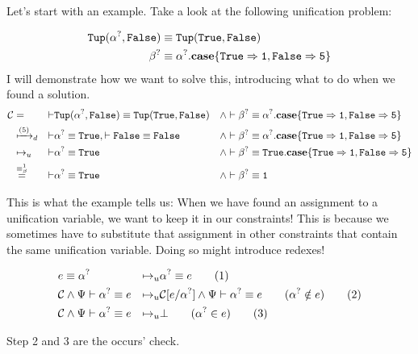 \documentclass[twoside,12pt,a4paper]{article}
\begin{document}
Let's start with an example. Take a look at the following unification problem:
\begin{example}
    \begin{align*}
        \mathtt{Tup(\alpha^?, False)}&\equiv \mathtt{Tup(True, False)}\\
        \beta^?&\equiv \alpha^?.\textbf{case}\{\mathtt{True \Rightarrow 1, False\Rightarrow 5}\}
    \end{align*}        
    I will demonstrate how we want to solve this, introducing what to do when we found a solution.
    \begin{align*}
        \mathcal{C} &= &\vdash& \mathtt{Tup(\alpha^?, False)}\equiv \mathtt{Tup(True, False)}&\wedge&
        \vdash \beta^?\equiv \alpha^?.\textbf{case}\{\mathtt{True \Rightarrow 1, False\Rightarrow 5}\}\\
        &\xmapsto{(5)}_d &\vdash& \mathtt{\alpha^?\equiv True}, \vdash \mathtt{False\equiv False} &\wedge& 
        \vdash \beta^?\equiv \alpha^?.\textbf{case}\{\mathtt{True \Rightarrow 1, False\Rightarrow 5}\}\\
        &\mapsto_u &\vdash&\mathtt{\alpha^?\equiv True} &\wedge&
        \vdash \beta^?\equiv \mathtt{True}.\textbf{case}\{\mathtt{True \Rightarrow 1, False\Rightarrow 5}\}\\
        &\stackrel{\equiv_{\beta}^1}{=} &\vdash&\mathtt{\alpha^?\equiv True} &\wedge&
        \vdash \beta^?\equiv \mathtt{1}
    \end{align*}      
\end{example}
This is what the example tells us: When we have found an assignment to a unification variable, we want to keep it in our constraints!
This is because we sometimes have to substitute that assignment in other constraints that contain the same unification variable.
Doing so might introduce redexes!
\begin{definition}[Unification]
    \begin{align*}
        & e \equiv\alpha^?
        &\mapsto_u& \alpha^? \equiv e 
        \tag{1}\\
        &\mathcal{C} \wedge \Psi \vdash \alpha^? \equiv e 
        &\mapsto_u& \mathcal{C}[e/\alpha^?] \wedge \Psi \vdash \alpha^? \equiv e \qquad (\alpha^? \notin e)
        \tag{2}\\
        &\mathcal{C} \wedge \Psi \vdash \alpha^? \equiv e
        &\mapsto_u& \bot \qquad(\alpha^?\in e)
        \tag{3}
    \end{align*}
\end{definition}
Step 2 and 3 are the occurs' check.
\end{document}
